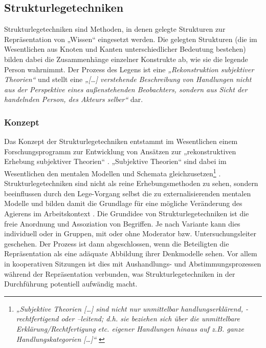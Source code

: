 
\subsection{Strukturlegetechniken} %
\label{sub:strukturlegetechniken}

Strukturlegetechniken sind Methoden, in denen gelegte Strukturen zur Repräsentation von „Wissen“ eingesetzt werden. Die gelegten Strukturen (die im Wesentlichen aus Knoten und Kanten unterschiedlicher Bedeutung bestehen) bilden dabei die Zusammenhänge einzelner Konstrukte ab, wie sie die legende Person wahrnimmt. Der Prozess des Legens ist eine \emph{„Rekonstruktion subjektiver Theorien“} \citep{Dann92} und stellt eine \emph{„[\ldots] verstehende Beschreibung von Handlungen nicht aus der Perspektive eines außenstehenden Beobachters, sondern aus Sicht der handelnden Person, des Akteurs selber“} \citep[][S. 2]{Dann92} dar.

\subsubsection{Konzept}

Das Konzept der Strukturlegetechniken entstammt im Wesentlichen einem Forschungsprogramm zur Entwicklung von Ansätzen zur „rekonstruktiven Erhebung subjektiver Theorien“ \citep{Dann92}. „Subjektive Theorien“ sind dabei im Wesentlichen den mentalen Modellen und Schemata gleichzusetzen\footnote{\emph{„Subjektive Theorien [\ldots] sind nicht nur unmittelbar handlungserklärend, -rechtfertigend oder –leitend; d.h. sie beziehen sich über die unmittelbare Erklärung/Rechtfertigung etc. eigener Handlungen hinaus auf z.B. ganze Handlungskategorien [\ldots]“} \citep[][S. 34]{Scheele88}} \citep[][zitiert nach \citep{Huss03}]{Kluwe90}. Strukturlegetechniken sind nicht als reine Erhebungsmethoden zu sehen, sondern beeinflussen durch den Lege-Vorgang selbst die zu externalisierenden mentalen Modelle und bilden damit die Grundlage für eine mögliche Veränderung des Agierens im Arbeitskontext \citep[][S. 6]{Dann92}.
Die Grundidee von Strukturlegetechniken ist die freie Anordnung und Assoziation von Begriffen. Je nach Variante kann dies individuell oder in Gruppen, mit oder ohne Moderator bzw. Untersuchungsleiter geschehen. Der Prozess ist dann abgeschlossen, wenn die Beteiligten die Repräsentation als eine adäquate Abbildung ihrer Denkmodelle sehen. Vor allem in kooperativen Sitzungen ist dies mit Aushandlungs- und Abstimmungsprozessen während der Repräsentation verbunden, was Strukturlegetechniken in der Durchführung potentiell aufwändig macht.

